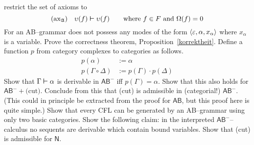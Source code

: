 restrict the set of axioms to 
\begin{equation}
\mbox{\rm (ax$_{\mathfrak{A}}$)} \quad \upsilon(f) \boldsymbol{\vdash} \upsilon(f)
    \qquad \text{where $f \in F$ and $\Omega(f) = 0$}
\end{equation}
For an AB--grammar does not possess any modes of the form 
$\langle \varepsilon, \alpha, x_{\alpha}\rangle$ where $x_{\alpha}$
is a variable. 
\vplatz
\exercise
Prove the correctness theorem, Proposition~\ref{korrektheit}.
\vplatz
\exercise
Define a function $p$ from category complexes to categories as follows.
\begin{equation}
\begin{split}
p(\alpha) & := \alpha \\
p(\Gamma \circ \Delta) & := p(\Gamma) \cdot p(\Delta)
\end{split}
\end{equation}
Show that $\Gamma \boldsymbol{\vdash} \alpha$ is derivable in $\mathsf{AB}^-$ 
iff $p(\Gamma) = \alpha$. Show that this also holds for $\mathsf{AB}^- + %
\mbox{(cut)}$. Conclude from this that (cut) is admissible 
in (categorial!) $\mathsf{AB}^-$. (This could in principle be extracted 
from the proof for $\mathsf{AB}$, but this proof here is quite 
simple.)
\vplatz
\exercise
Show that every CFL can be generated by an AB--grammar 
using only two basic categories. 
\vplatz
\exercise
Show the following claim: in the interpreted
$\mathsf{AB}^-$--calculus no sequents are derivable
which contain bound variables.
\vplatz
\exercise
\label{ueb:nschnitt}
Show that (cut) is admissible for $\mathsf{N}$.
